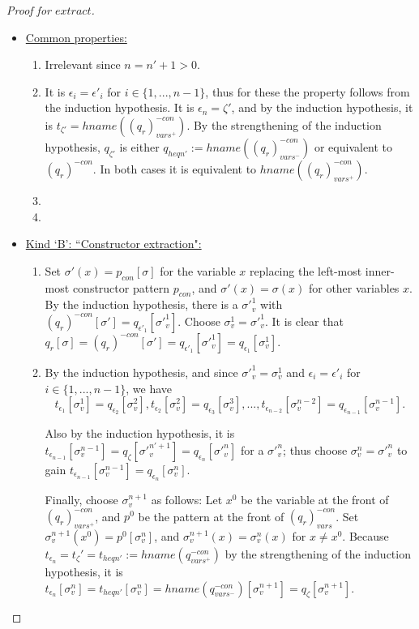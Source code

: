 \documentclass[11pt]{article} %
\begin{document}
\begin{proof}[Proof for $extract$]
\begin{itemize}
\begin{itemize}
\item \underline{Common properties:}
\begin{enumerate}
\item Irrelevant since $n = n'+1 > 0$.
\item It is $\epsilon_i = \epsilon'_i$ for $i \in \{1, ..., n-1\}$, thus for these the property follows from the induction hypothesis. It is $\epsilon_n = \zeta'$, and by the induction hypothesis, it is $t_{\zeta'} = hname((q_r)^{-con}_{vars^+})$. By the strengthening of the induction hypothesis, $q_{\zeta'}$ is either $q_{heqn'} := hname((q_r)^{-con}_{vars^-})$ or equivalent to $(q_r)^{-con}$. In both cases it is equivalent to $hname((q_r)^{-con}_{vars^+})$.
\item
\item 
\end{enumerate}

\item \underline{Kind `B': ``Constructor extraction":}
\begin{enumerate}
\item Set $\sigma'(x) = p_{con}[\sigma]$ for the variable $x$ replacing the left-most inner- most constructor pattern $p_{con}$, and $\sigma'(x) = \sigma(x)$ for other variables $x$. By the induction hypothesis, there is a $\sigma'^1_v$ with $(q_r)^{-con}[\sigma'] = q_{\epsilon'_1}[\sigma'^1_v]$. Choose $\sigma^1_v = \sigma'^1_v$. It is clear that $q_r[\sigma] = (q_r)^{-con}[\sigma'] = q_{\epsilon'_1}[\sigma'^1_v] = q_{\epsilon_1}[\sigma^1_v]$.

\item By the induction hypothesis, and since $\sigma'^1_v = \sigma^1_v$ and $\epsilon_i = \epsilon'_i$ for $i \in \{1, ..., n-1\}$, we have
\begin{equation*}
t_{\epsilon_1}[\sigma^1_v] = q_{\epsilon_2}[\sigma^2_v], t_{\epsilon_2}[\sigma^2_v] = q_{\epsilon_3}[\sigma^3_v], ..., t_{\epsilon_{n-2}}[\sigma^{n-2}_v] = q_{\epsilon_{n-1}}[\sigma^{n-1}_v].
\end{equation*}

Also by the induction hypothesis, it is $t_{\epsilon_{n-1}}[\sigma^{n-1}_v] = q_\zeta[\sigma'^{n' +1}_v] = q_{\epsilon_n}[\sigma'^{n}_v]$ for a $\sigma'^{n}_v$; thus choose $\sigma^{n}_v = \sigma'^{n}_v$ to gain $t_{\epsilon_{n-1}}[\sigma^{n-1}_v] = q_{\epsilon_n}[\sigma^{n}_v]$.

Finally, choose $\sigma^{n+1}_v$ as follows: Let $x^0$ be the variable at the front of $(q_r)^{-con}_{vars^+}$, and $p^0$ be the pattern at the front of $(q_r)^{-con}_{vars}$. Set $\sigma^{n+1}_v(x^0) = p^0[\sigma^n_v]$, and $\sigma^{n+1}_v(x) = \sigma^n_v(x)$ for $x \neq x^0$. Because $t_{\epsilon_n} = t_\zeta' = t_{heqn'} := hname(q^{-con}_{vars^+})$ by the strengthening of the induction hypothesis, it is $t_{\epsilon_n}[\sigma^n_v] = t_{heqn'}[\sigma^n_v] = hname(q^{-con}_{vars^-})[\sigma^{n+1}_v] = q_\zeta[\sigma^{n+1}_v]$.


\end{enumerate}
\end{itemize}
\end{itemize}
\end{proof}
\end{document}
